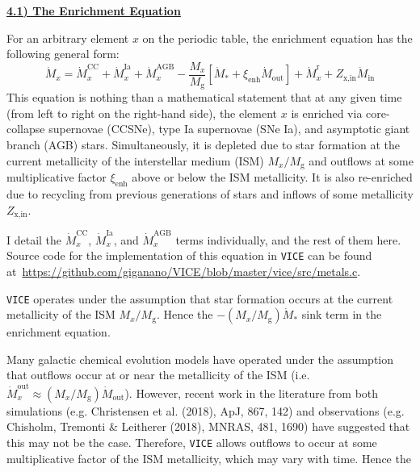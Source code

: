 \documentclass{report}
\begin{document}
\newpage 
\noindent 
\begin{center} 
\hypertarget{enrichment:equation}{
	\underline{\LARGE
		\textbf{4.1) The Enrichment Equation} 
	}
}
\end{center}
\par\noindent 
For an arbitrary element $x$ on the periodic table, the enrichment equation 
has the following general form: 
\begin{equation}
\dot{M}_x = \dot{M}_x^\text{CC} + \dot{M}_x^\text{Ia} + \dot{M}_x^\text{AGB} 
- \frac{M_x}{M_\text{g}}[\dot{M}_* + \xi_\text{enh}\dot{M}_\text{out}] + 
\dot{M}_x^\text{r} + Z_\text{x,in}\dot{M}_\text{in}
\end{equation}
This equation is nothing than a mathematical statement that at any given time 
(from left to right on the right-hand side), the element $x$ is enriched via 
core-collapse supernovae (CCSNe), type Ia supernovae (SNe Ia), and asymptotic 
giant branch (AGB) stars. Simultaneously, it is depleted due to star formation 
at the current metallicity of the interstellar medium (ISM) $M_x/M_\text{g}$ 
and outflows at some multiplicative factor $\xi_\text{enh}$ above or below the 
ISM metallicity.  It is also re-enriched due to recycling from previous 
generations of stars and inflows of some metallicity $Z_\text{x,in}$.  
\par
I detail the $\dot{M}_x^\text{CC}$, $\dot{M}_x^\text{Ia}$, and 
$\dot{M}_x^\text{AGB}$ terms individually, and the rest of them here. Source 
code for the implementation of this equation in \texttt{VICE} can be found 
at~\url{https://github.com/giganano/VICE/blob/master/vice/src/metals.c}. 
\par
\texttt{VICE} operates under the assumption that star formation occurs at the 
current metallicity of the ISM $M_x/M_\text{g}$. Hence the 
$-(M_x/M_\text{g})\dot{M}_*$ sink term in the enrichment equation. 
\par 
Many galactic chemical evolution models have operated under the assumption that 
outflows occur at or near the metallicity of the ISM (i.e. 
$\dot{M}_x^\text{out} \approx (M_x/M_\text{g})\dot{M}_\text{out}$). However, 
recent work in the literature from both simulations (e.g. Christensen et al. 
(2018), ApJ, 867, 142) and observations (e.g. Chisholm, Tremonti \& Leitherer 
(2018), MNRAS, 481, 1690) have suggested that this may not be the case. 
Therefore, \texttt{VICE} allows outflows to occur at some multiplicative 
factor of the ISM metallicity, which may vary with time. Hence the 
\end{document}
